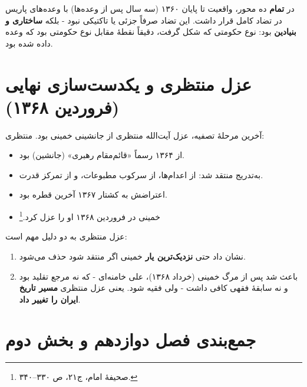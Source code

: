 \documentclass[12pt,a4paper]{book}
\newcommand{\keyword}[1]{\textbf{\textcolor{cPrimary}{#1}}}
\begin{document}
\begin{warningBox}
در \keyword{تمام} ده محور، واقعیت تا پایان ۱۳۶۰ (سه سال پس از وعده‌ها) با وعده‌های پاریس در تضاد کامل قرار داشت. این تضاد صرفاً جزئی یا تاکتیکی نبود - بلکه \keyword{ساختاری و بنیادین} بود: نوع حکومتی که شکل گرفت، دقیقاً نقطهٔ مقابل نوع حکومتی بود که وعده داده شده بود.
\end{warningBox}

\section{عزل منتظری و یکدست‌سازی نهایی (فروردین ۱۳۶۸)}

آخرین مرحلهٔ تصفیه، عزل آیت‌الله منتظری از جانشینی خمینی بود. منتظری:

\begin{itemize}[label=\textcolor{cPrimary}{$\blacktriangleright$}, rightmargin=2em]
    \item از ۱۳۶۴ رسماً «قائم‌مقام رهبری» (جانشین) بود.
    \item به‌تدریج منتقد شد: از اعدام‌ها، از سرکوب مطبوعات، و از تمرکز قدرت.
    \item اعتراضش به کشتار ۱۳۶۷ آخرین قطره بود.
    \item خمینی در فروردین ۱۳۶۸ او را عزل کرد.\footnote{صحیفهٔ امام، ج۲۱، ص ۳۳۰–۳۴۰.}
\end{itemize}

\begin{noteBox}
عزل منتظری به دو دلیل مهم است:
\begin{enumerate}[label=\textcolor{cGold}{\bfseries\arabic*.}, rightmargin=2em]
    \item نشان داد حتی \keyword{نزدیک‌ترین یار} خمینی اگر منتقد شود حذف می‌شود.
    \item باعث شد پس از مرگ خمینی (خرداد ۱۳۶۸)، علی خامنه‌ای - که نه مرجع تقلید بود و نه سابقهٔ فقهی کافی داشت - ولی فقیه شود. یعنی عزل منتظری \keyword{مسیر تاریخ ایران را تغییر داد}.
\end{enumerate}
\end{noteBox}

\section{جمع‌بندی فصل دوازدهم و بخش دوم}
\end{document}

